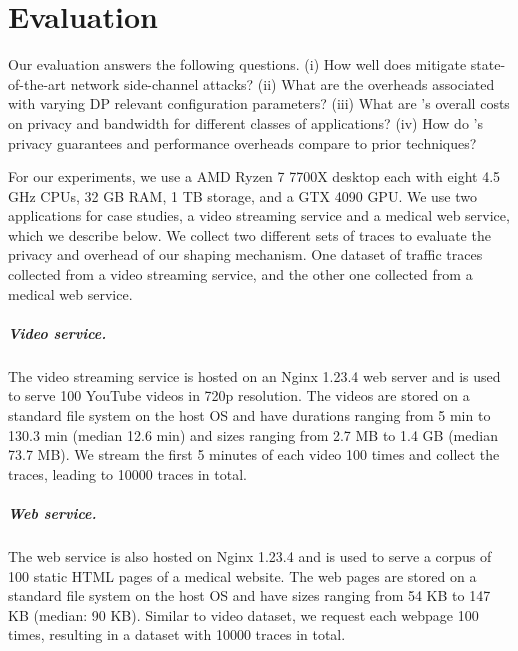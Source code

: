 \chapter{Evaluation}\label{ch:evaluation}
Our evaluation answers the following questions.
(i) How well does {\sys} mitigate state-of-the-art network side-channel attacks?
(ii) What are the overheads associated with varying DP relevant configuration parameters?
(iii) What are {\sys}'s overall costs on privacy and bandwidth for different classes of applications?
(iv) How do {\sys}'s privacy guarantees and performance overheads compare to prior techniques?


For our experiments, we use a AMD Ryzen 7 7700X desktop each with eight 4.5 GHz CPUs, 32 GB RAM, 1 TB storage, and a GTX 4090 GPU.
We use two applications for case studies, a video streaming service and a medical web service, which we describe below.
We collect two different sets of traces to evaluate the privacy and overhead of our shaping mechanism.
One dataset of traffic traces collected from a video streaming service, and the other one collected from a medical web service.
\paragraph{Video service.}
The video streaming service is hosted on an Nginx 1.23.4 web server and is used to serve 100 YouTube videos in 720p resolution.
The videos are stored on a standard file system on the host OS and have durations ranging from 5 min to 130.3 min (median 12.6 min) and sizes ranging from 2.7 MB to 1.4 GB (median 73.7 MB).
We stream the first 5 minutes of each video 100 times and collect the traces, leading to 10000 traces in total.

\paragraph{Web service.}
The web service is also hosted on Nginx 1.23.4 and is used to serve a corpus of 100 static HTML pages of a medical website.
The web pages are stored on a standard file system on the host OS and have sizes ranging from 54 KB to 147 KB (median: 90 KB).
Similar to video dataset, we request each webpage 100 times, resulting in a dataset with 10000 traces in total.
%

